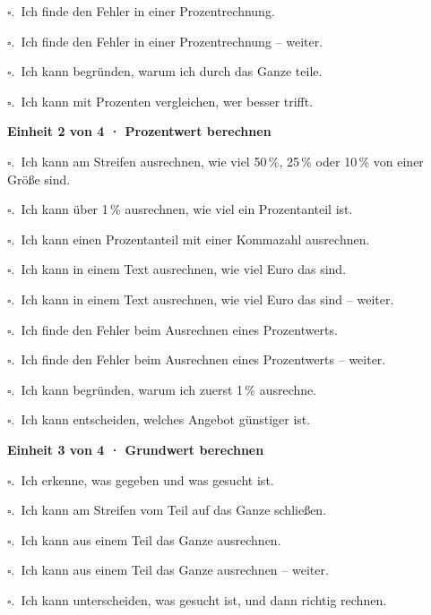 {\noindent$\square$.\ Ich finde den Fehler in einer Prozentrechnung.\par
\noindent$\square$.\ Ich finde den Fehler in einer Prozentrechnung – weiter.\par
\noindent$\square$.\ Ich kann begründen, warum ich durch das Ganze teile.\par
\noindent$\square$.\ Ich kann mit Prozenten vergleichen, wer besser trifft.\par
\par\smallskip\noindent\textbf{Einheit 2 von 4 · Prozentwert berechnen}\par
\noindent$\square$.\ Ich kann am Streifen ausrechnen, wie viel 50\,\%, 25\,\% oder 10\,\% von einer Größe sind.\par
\noindent$\square$.\ Ich kann über 1\,\% ausrechnen, wie viel ein Prozentanteil ist.\par
\noindent$\square$.\ Ich kann einen Prozentanteil mit einer Kommazahl ausrechnen.\par
\noindent$\square$.\ Ich kann in einem Text ausrechnen, wie viel Euro das sind.\par
\noindent$\square$.\ Ich kann in einem Text ausrechnen, wie viel Euro das sind – weiter.\par
\noindent$\square$.\ Ich finde den Fehler beim Ausrechnen eines Prozentwerts.\par
\noindent$\square$.\ Ich finde den Fehler beim Ausrechnen eines Prozentwerts – weiter.\par
\noindent$\square$.\ Ich kann begründen, warum ich zuerst 1\,\% ausrechne.\par
\noindent$\square$.\ Ich kann entscheiden, welches Angebot günstiger ist.\par
\par\smallskip\noindent\textbf{Einheit 3 von 4 · Grundwert berechnen}\par
\noindent$\square$.\ Ich erkenne, was gegeben und was gesucht ist.\par
\noindent$\square$.\ Ich kann am Streifen vom Teil auf das Ganze schließen.\par
\noindent$\square$.\ Ich kann aus einem Teil das Ganze ausrechnen.\par
\noindent$\square$.\ Ich kann aus einem Teil das Ganze ausrechnen – weiter.\par
\noindent$\square$.\ Ich kann unterscheiden, was gesucht ist, und dann richtig rechnen.\par
}
